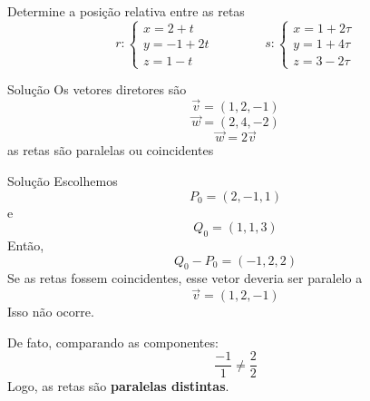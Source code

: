 \begin{question}
  Determine a posição relativa entre as retas
  \[
    r\colon
    \begin{cases}
      x = 2+t   \\
      y = -1+2t \\
      z = 1-t
    \end{cases}
  \qquad\qquad
    s\colon
    \begin{cases}
      x = 1+2\tau \\
      y = 1+4\tau \\
      z = 3-2\tau
    \end{cases}
  \]
\end{question}

\begin{resolution}{Solução}
  Os vetores diretores são
  \[
    \vec{v} = (1, 2, -1)
  \]
  \[
    \vec{w} = (2, 4, -2)
  \]
  \[
    \vec{w} = 2\vec{v}
  \]
  as retas são paralelas ou coincidentes
\end{resolution}

\begin{resolution}{Solução}
  Escolhemos
  \[
  P_0=(2,-1,1)
  \]
  e
  \[
  Q_0=(1,1,3)
  \]
  Então,
  \[
  Q_0-P_0=(-1,2,2)
  \]
  Se as retas fossem coincidentes, esse vetor deveria ser paralelo a
  \[
  \vec v=(1,2,-1)
  \]
  Isso não ocorre.

  De fato, comparando as componentes:
  \[
  \frac{-1}{1}\neq\frac{2}{2}
  \]
  Logo, as retas são \textbf{paralelas distintas}.
\end{resolution}

\endinput